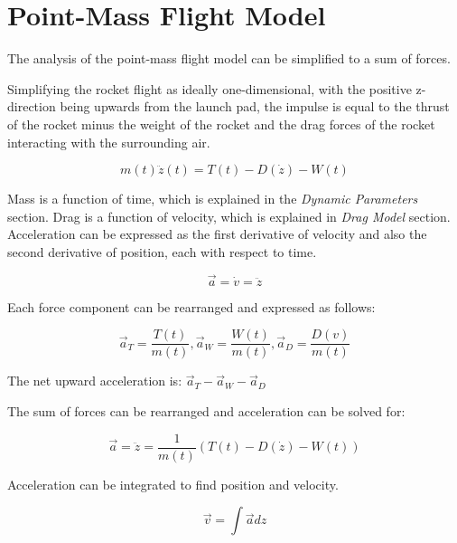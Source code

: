 \documentclass[]{article}
\begin{document}
\clearpage

\section{Point-Mass Flight Model}\label{point-mass-flight-model}

The analysis of the point-mass flight model can be simplified to a sum
of forces.

Simplifying the rocket flight as ideally one-dimensional, with the
positive z-direction being upwards from the launch pad, the impulse is
equal to the thrust of the rocket minus the weight of the rocket and the
drag forces of the rocket interacting with the surrounding air.

\begin{equation}
\label{eq_vertical_flight_eom}
m(t)\ddot{z}(t) = T(t) - D(\dot{z}) - W(t)
\end{equation}

Mass is a function of time, which is explained in the \emph{Dynamic
Parameters} section. Drag is a function of velocity, which is explained
in \emph{Drag Model} section. Acceleration can be expressed as the first
derivative of velocity and also the second derivative of position, each
with respect to time.

\begin{equation}
\vec{a} = \dot{v} = \ddot{z}
\end{equation}

Each force component can be rearranged and expressed as follows:

\begin{equation}
\vec{a}_T = \dfrac{T(t)}{m(t)}, \vec{a}_W = \dfrac{W(t)}{m(t)}, \vec{a}_D = \dfrac{D(v)}{m(t)}
\end{equation}

The net upward acceleration is: \(\vec{a}_T - \vec{a}_W - \vec{a}_D\)

The sum of forces can be rearranged and acceleration can be solved for:

\begin{equation}
\label{vertical_flight_equation}
\vec{a} =  \ddot{z} = \dfrac{1}{m(t)} (T(t) - D(\dot{z}) - W(t)) 
\end{equation}

Acceleration can be integrated to find position and velocity.

\begin{equation}
\vec{v} = \int \vec{a} dz
\end{equation}
\end{document}
